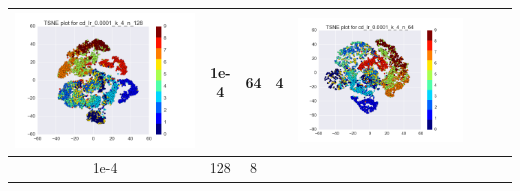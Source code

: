 \documentclass[12pt]{report}
\begin{document}
\begin{table}[H]
\begin{tabular}{ | c | c | c | c || c | c | c| c |}
\begin{minipage}{.3\textwidth}
      \includegraphics[scale=0.25]{cd_lr_0_0001_k_4_n_128.png}
    \end{minipage}
	&
    1e-4 & 64 & 4 &
    \begin{minipage}{.3\textwidth}
      \includegraphics[scale=0.25]{cd_lr_0_0001_k_4_n_64.png}
    \end{minipage}
    \\ \hline
        1e-4 & 128 & 8 &
    \begin{minipage}{.3\textwidth}

\end{minipage}
\end{tabular}
\end{table}
\end{document}
